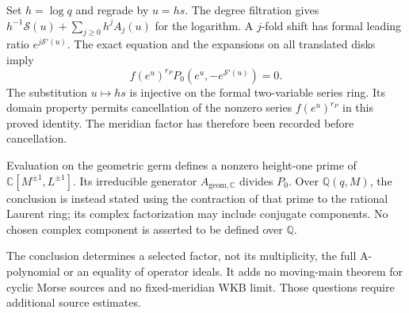 Set $h=\log q$ and regrade by $u=hs$. The degree filtration gives
$h^{-1}\mathcal S(u)+\sum_{j\ge0}h^jA_j(u)$ for the logarithm.
A $j$-fold shift has formal leading ratio $e^{j\mathcal S'(u)}$.
The exact equation and the expansions on all translated disks imply
\begin{equation}\label{dao-ch:symbol}
 f(e^u)^{r_P}P_0(e^u,-e^{\mathcal S'(u)})=0.
\end{equation}
The substitution $u\mapsto hs$ is injective on the formal two-variable
series ring. Its domain property permits cancellation of the
nonzero series $f(e^u)^{r_P}$ in this proved identity. The meridian
factor has therefore been recorded before cancellation.

Evaluation on the geometric germ defines a nonzero height-one
prime of $\mathbb C[M^{\pm1},L^{\pm1}]$. Its irreducible generator
$A_{\mathrm{geom},\mathbb C}$ divides $P_0$. Over
$\mathbb Q(q,M)$, the conclusion is instead stated using the
contraction of that prime to the rational Laurent ring; its
complex factorization may include conjugate components. No chosen
complex component is asserted to be defined over $\mathbb Q$.

The conclusion determines a selected factor, not its multiplicity,
the full A-polynomial or an equality of operator ideals. It adds no
moving-main theorem for cyclic Morse sources and no fixed-meridian
WKB limit. Those questions require additional source estimates.

